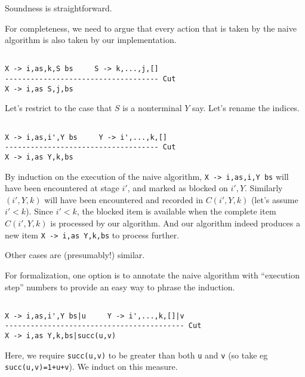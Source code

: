 \documentclass[]{article}
\begin{document}
\begin{multicols}{2}
Soundness is straightforward.

For completeness, we need to argue that every action that is taken by
the naive algorithm is also taken by our implementation.

\begin{verbatim}

X -> i,as,k,S bs     S -> k,...,j,[]
------------------------------------ Cut
X -> i,as S,j,bs

\end{verbatim}

Let's restrict to the case that \(S\) is a nonterminal \(Y\) say. Let's
rename the indices.

\begin{verbatim}

X -> i,as,i',Y bs     Y -> i',...,k,[]
------------------------------------ Cut
X -> i,as Y,k,bs

\end{verbatim}

By induction on the execution of the naive algorithm,
\texttt{X -\textgreater{} i,as,i\textquotesingle{},Y bs} will have been
encountered at stage \(i'\), and marked as blocked on \(i',Y\).
Similarly \((i',Y,k)\) will have been encountered and recorded in
\(C(i',Y,k)\) (let's assume \(i' < k\)). Since \(i' < k\), the blocked
item is available when the complete item \(C(i',Y,k)\) is processed by
our algorithm. And our algorithm indeed produces a new item
\texttt{X -\textgreater{} i,as Y,k,bs} to process further.

Other cases are (presumably!) similar.

For formalization, one option is to annotate the naive algorithm with
``execution step'' numbers to provide an easy way to phrase the
induction.

\begin{verbatim}

X -> i,as,i',Y bs|u     Y -> i',...,k,[]|v
------------------------------------------ Cut
X -> i,as Y,k,bs|succ(u,v)

\end{verbatim}

Here, we require \texttt{succ(u,v)} to be greater than both \texttt{u}
and \texttt{v} (so take eg \texttt{succ(u,v)=1+u+v}). We induct on this
measure.

\end{multicols}
\end{document}
